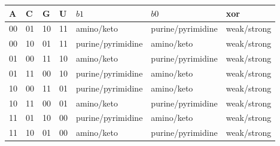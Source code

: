 \begingroup
\scriptsize
\setlength{\tabcolsep}{4pt}
\renewcommand{\arraystretch}{1.15}
\begin{center}
\begin{tabular}{lllllll}
\toprule
A & C & G & U & $b1$ & $b0$ & xor \\
\midrule
00 & 01 & 10 & 11 & amino/keto & purine/pyrimidine & weak/strong \\
00 & 10 & 01 & 11 & purine/pyrimidine & amino/keto & weak/strong \\
01 & 00 & 11 & 10 & amino/keto & purine/pyrimidine & weak/strong \\
01 & 11 & 00 & 10 & purine/pyrimidine & amino/keto & weak/strong \\
10 & 00 & 11 & 01 & purine/pyrimidine & amino/keto & weak/strong \\
10 & 11 & 00 & 01 & amino/keto & purine/pyrimidine & weak/strong \\
11 & 01 & 10 & 00 & purine/pyrimidine & amino/keto & weak/strong \\
11 & 10 & 01 & 00 & amino/keto & purine/pyrimidine & weak/strong \\
\bottomrule
\end{tabular}
\end{center}
\endgroup


